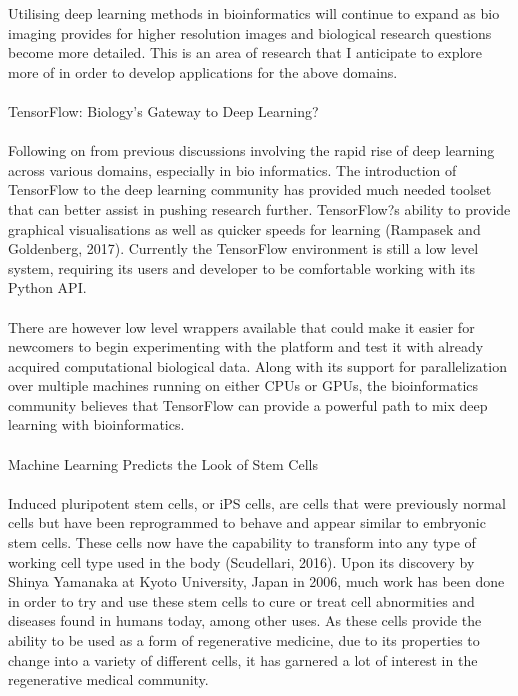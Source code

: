 {Utilising deep learning methods in bioinformatics will continue to expand as bio imaging provides for higher resolution images and biological research questions become more detailed. This is an area of research that I anticipate to explore more of in order to develop applications for the above domains. \\ \\
TensorFlow: Biology's Gateway to Deep Learning? \\ \\
 Following on from previous discussions involving the rapid rise of deep learning across various domains, especially in bio informatics. The introduction of TensorFlow to the deep learning community has provided much needed toolset that can better assist in pushing research further. TensorFlow?s ability to provide graphical visualisations as well as quicker speeds for learning (Rampasek and Goldenberg, 2017). Currently the TensorFlow environment is still a low level system, requiring its users and developer to be comfortable working with its Python API. \\ \\
 There are however low level wrappers available that could make it easier for newcomers to begin experimenting with the platform and test it with already acquired computational biological data. Along with its support for parallelization over multiple machines running on either CPUs or GPUs, the bioinformatics community believes that TensorFlow can provide a powerful path to mix deep learning with bioinformatics. \\ \\
Machine Learning Predicts the Look of Stem Cells \\ \\
Induced pluripotent stem cells, or iPS cells, are cells that were previously normal cells but have been reprogrammed to behave and appear similar to embryonic stem cells. These cells now have the capability to transform into any type of working cell type used in the body (Scudellari, 2016). Upon its discovery by Shinya Yamanaka at Kyoto University, Japan in 2006, much work has been done in order to try and use these stem cells to cure or treat cell abnormities and diseases found in humans today, among other uses. As these cells provide the ability to be used as a form of regenerative medicine, due to its properties to change into a variety of different cells, it has garnered a lot of interest in the regenerative medical community. \\ \\
}
